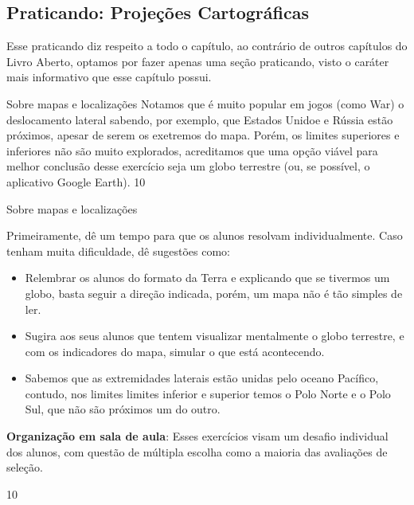\begin{texto}
{ 
  \section{Praticando: Projeções Cartográficas}
  Esse praticando diz respeito a todo o capítulo, ao contrário de outros capítulos do Livro Aberto, optamos por fazer apenas uma seção praticando, visto o caráter mais informativo que esse capítulo possui.
}
\end{texto}
\begin{ObjetivoEsp}{Sobre mapas e localizações}
{
  Notamos que é muito popular em jogos (como War) o deslocamento lateral sabendo, por exemplo, que Estados Unidoe e Rússia estão próximos, apesar de serem os exetremos do mapa. Porém, os limites superiores e inferiores não são muito explorados, acreditamos que uma opção viável para melhor conclusão desse exercício seja um globo terrestre (ou, se possível, o aplicativo Google Earth).
}{1}{0}
\end{ObjetivoEsp}
\begin{Recomenda}{Sobre mapas e localizações}
{
  Primeiramente, dê um tempo para que os alunos resolvam individualmente. Caso tenham muita dificuldade, dê sugestões como:
  \begin{itemize}
  \item Relembrar os alunos do formato da Terra e explicando que se tivermos um globo, basta seguir a direção indicada, porém, um mapa não é tão simples de ler.
  \item Sugira aos seus alunos que tentem visualizar mentalmente o globo terrestre, e com os indicadores do mapa, simular o que está acontecendo.
  \item Sabemos que as extremidades laterais estão unidas pelo oceano Pacífico, contudo, nos limites limites inferior e superior temos o Polo Norte e o Polo Sul, que não são próximos um do outro.
  \end{itemize}

  \textbf{Organização em sala de aula}: Esses exercícios visam um desafio individual dos alunos, com questão de múltipla escolha como a maioria das avaliações de seleção.
}{1}{0}
\end{Recomenda}
\clearmargin
